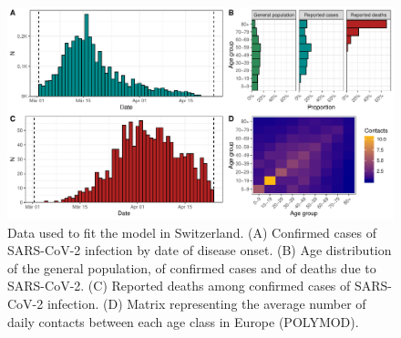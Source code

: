 \documentclass{article}
\begin{document}
\begin{figure}[h]
		\centering
		\includegraphics[width=15cm]{../format_output/figures/data_switzerland.pdf}
		\caption{Data used to fit the model in Switzerland. (A) Confirmed cases of SARS-CoV-2 infection by date of disease onset. (B) Age distribution of the general population, of confirmed cases and of deaths due to SARS-CoV-2. (C) Reported deaths among confirmed cases of SARS-CoV-2 infection. (D) Matrix representing the average number of daily contacts between each age class in Europe (POLYMOD).}
		\label{fig:switzerland}
\end{figure}
	
	
%
\end{document}
